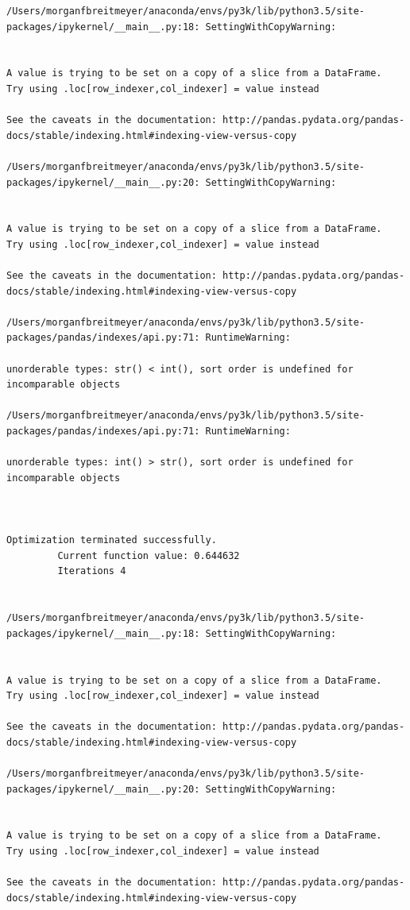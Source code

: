 \begin{lstlisting}
/Users/morganfbreitmeyer/anaconda/envs/py3k/lib/python3.5/site-packages/ipykernel/__main__.py:18: SettingWithCopyWarning:


A value is trying to be set on a copy of a slice from a DataFrame.
Try using .loc[row_indexer,col_indexer] = value instead

See the caveats in the documentation: http://pandas.pydata.org/pandas-docs/stable/indexing.html#indexing-view-versus-copy

/Users/morganfbreitmeyer/anaconda/envs/py3k/lib/python3.5/site-packages/ipykernel/__main__.py:20: SettingWithCopyWarning:


A value is trying to be set on a copy of a slice from a DataFrame.
Try using .loc[row_indexer,col_indexer] = value instead

See the caveats in the documentation: http://pandas.pydata.org/pandas-docs/stable/indexing.html#indexing-view-versus-copy

/Users/morganfbreitmeyer/anaconda/envs/py3k/lib/python3.5/site-packages/pandas/indexes/api.py:71: RuntimeWarning:

unorderable types: str() < int(), sort order is undefined for incomparable objects

/Users/morganfbreitmeyer/anaconda/envs/py3k/lib/python3.5/site-packages/pandas/indexes/api.py:71: RuntimeWarning:

unorderable types: int() > str(), sort order is undefined for incomparable objects



Optimization terminated successfully.
         Current function value: 0.644632
         Iterations 4


/Users/morganfbreitmeyer/anaconda/envs/py3k/lib/python3.5/site-packages/ipykernel/__main__.py:18: SettingWithCopyWarning:


A value is trying to be set on a copy of a slice from a DataFrame.
Try using .loc[row_indexer,col_indexer] = value instead

See the caveats in the documentation: http://pandas.pydata.org/pandas-docs/stable/indexing.html#indexing-view-versus-copy

/Users/morganfbreitmeyer/anaconda/envs/py3k/lib/python3.5/site-packages/ipykernel/__main__.py:20: SettingWithCopyWarning:


A value is trying to be set on a copy of a slice from a DataFrame.
Try using .loc[row_indexer,col_indexer] = value instead

See the caveats in the documentation: http://pandas.pydata.org/pandas-docs/stable/indexing.html#indexing-view-versus-copy


\end{lstlisting}
